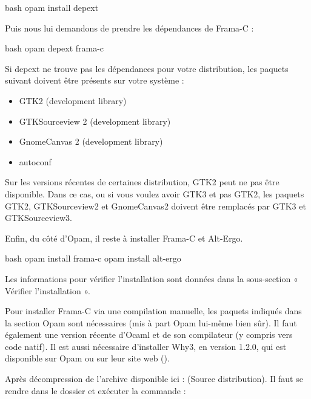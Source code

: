 \begin{CodeBlock}{bash}
opam install depext
\end{CodeBlock}


Puis nous lui demandons de prendre les dépendances de Frama-C :


\begin{CodeBlock}{bash}
opam depext frama-c
\end{CodeBlock}


Si depext ne trouve pas les dépendances pour votre distribution, les paquets
suivant doivent être présents sur votre système :


\begin{itemize}
\item GTK2 (development library)
\item GTKSourceview 2 (development library)
\item GnomeCanvas 2 (development library)
\item autoconf
\end{itemize}

Sur les versions récentes de certaines distribution, GTK2 peut ne pas
être disponible. Dans ce cas, ou si vous voulez avoir GTK3 et pas GTK2,
les paquets GTK2, GTKSourceview2 et GnomeCanvas2 doivent être remplacés
par GTK3 et GTKSourceview3.


Enfin, du côté d'Opam, il reste à installer Frama-C et Alt-Ergo.



\begin{CodeBlock}{bash}
opam install frama-c
opam install alt-ergo
\end{CodeBlock}


Les informations pour vérifier l'installation sont données dans la sous-section « Vérifier l'installation ».





Pour installer Frama-C via une compilation manuelle, les paquets indiqués dans la
section Opam sont nécessaires (mis à part Opam lui-même bien sûr). Il faut
également une version récente d'Ocaml et de son compilateur (y compris vers
code natif). Il est aussi nécessaire d'installer Why3, en version 1.2.0,
qui est disponible sur Opam ou sur leur site web
().



Après décompression de l'archive disponible ici :
 (Source distribution).
Il faut se rendre dans le dossier et exécuter la commande :



